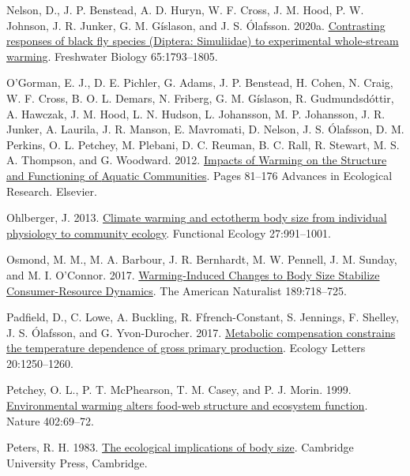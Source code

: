 \documentclass[
]{article}
\newlength{\cslhangindent}
\newlength{\cslentryspacingunit} %
\newenvironment{CSLReferences}[2] %
 {%
  \setlength{\parindent}{0pt}
  \ifodd #1
  \let\oldpar\par
  \def\par{\hangindent=\cslhangindent\oldpar}
  \fi
  \setlength{\parskip}{#2\cslentryspacingunit}
 }%
 {}
\begin{document}
\begin{CSLReferences}{1}{0}
\leavevmode{}%
Nelson, D., J. P. Benstead, A. D. Huryn, W. F. Cross, J. M. Hood, P. W.
Johnson, J. R. Junker, G. M. Gíslason, and J. S. Ólafsson. 2020a.
\href{https://doi.org/10.1111/fwb.13583}{Contrasting responses of black
fly species ({Diptera}: {Simuliidae}) to experimental whole-stream
warming}. Freshwater Biology 65:1793--1805.

\leavevmode{}%
O'Gorman, E. J., D. E. Pichler, G. Adams, J. P. Benstead, H. Cohen, N.
Craig, W. F. Cross, B. O. L. Demars, N. Friberg, G. M. Gíslason, R.
Gudmundsdóttir, A. Hawczak, J. M. Hood, L. N. Hudson, L. Johansson, M.
P. Johansson, J. R. Junker, A. Laurila, J. R. Manson, E. Mavromati, D.
Nelson, J. S. Ólafsson, D. M. Perkins, O. L. Petchey, M. Plebani, D. C.
Reuman, B. C. Rall, R. Stewart, M. S. A. Thompson, and G. Woodward.
2012. \href{https://doi.org/10.1016/B978-0-12-398315-2.00002-8}{Impacts
of {Warming} on the {Structure} and {Functioning} of {Aquatic
Communities}}. Pages 81--176 Advances in {Ecological Research}.
{Elsevier}.

\leavevmode{}%
Ohlberger, J. 2013.
\href{https://doi.org/10.1111/1365-2435.12098}{Climate warming and
ectotherm body size \textendash{} from individual physiology to
community ecology}. Functional Ecology 27:991--1001.

\leavevmode{}%
Osmond, M. M., M. A. Barbour, J. R. Bernhardt, M. W. Pennell, J. M.
Sunday, and M. I. O'Connor. 2017.
\href{https://doi.org/10.1086/691387}{Warming-{Induced Changes} to {Body
Size Stabilize Consumer-Resource Dynamics}}. The American Naturalist
189:718--725.

\leavevmode{}%
Padfield, D., C. Lowe, A. Buckling, R. Ffrench-Constant, S. Jennings, F.
Shelley, J. S. Ólafsson, and G. Yvon-Durocher. 2017.
\href{https://doi.org/10.1111/ele.12820}{Metabolic compensation
constrains the temperature dependence of gross primary production}.
Ecology Letters 20:1250--1260.

\leavevmode{}%
Petchey, O. L., P. T. McPhearson, T. M. Casey, and P. J. Morin. 1999.
\href{https://doi.org/10.1038/47023}{Environmental warming alters
food-web structure and ecosystem function}. Nature 402:69--72.

\leavevmode{}%
Peters, R. H. 1983. \href{https://doi.org/10.1017/CBO9780511608551}{The
ecological implications of body size}. {Cambridge University Press},
{Cambridge}.


\end{CSLReferences}
\end{document}
